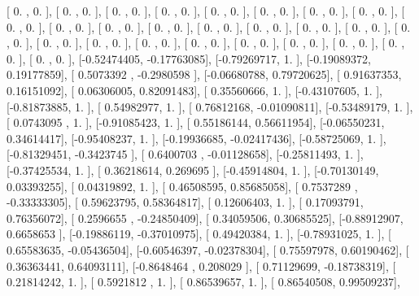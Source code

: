 \documentclass{article}
\begin{document}
       [ 0.        ,  0.        ],
       [ 0.        ,  0.        ],
       [ 0.        ,  0.        ],
       [ 0.        ,  0.        ],
       [ 0.        ,  0.        ],
       [ 0.        ,  0.        ],
       [ 0.        ,  0.        ],
       [ 0.        ,  0.        ],
       [ 0.        ,  0.        ],
       [ 0.        ,  0.        ],
       [ 0.        ,  0.        ],
       [ 0.        ,  0.        ],
       [ 0.        ,  0.        ],
       [ 0.        ,  0.        ],
       [ 0.        ,  0.        ],
       [ 0.        ,  0.        ],
       [ 0.        ,  0.        ],
       [ 0.        ,  0.        ],
       [ 0.        ,  0.        ],
       [ 0.        ,  0.        ],
       [ 0.        ,  0.        ],
       [ 0.        ,  0.        ],
       [ 0.        ,  0.        ],
       [ 0.        ,  0.        ],
       [ 0.        ,  0.        ],
       [ 0.        ,  0.        ],
       [-0.52474405, -0.17763085],
       [-0.79269717,  1.        ],
       [-0.19089372,  0.19177859],
       [ 0.5073392 , -0.2980598 ],
       [-0.06680788,  0.79720625],
       [ 0.91637353,  0.16151092],
       [ 0.06306005,  0.82091483],
       [ 0.35560666,  1.        ],
       [-0.43107605,  1.        ],
       [-0.81873885,  1.        ],
       [ 0.54982977,  1.        ],
       [ 0.76812168, -0.01090811],
       [-0.53489179,  1.        ],
       [ 0.0743095 ,  1.        ],
       [-0.91085423,  1.        ],
       [ 0.55186144,  0.56611954],
       [-0.06550231,  0.34614417],
       [-0.95408237,  1.        ],
       [-0.19936685, -0.02417436],
       [-0.58725069,  1.        ],
       [-0.81329451, -0.3423745 ],
       [ 0.6400703 , -0.01128658],
       [-0.25811493,  1.        ],
       [-0.37425534,  1.        ],
       [ 0.36218614,  0.269695  ],
       [-0.45914804,  1.        ],
       [-0.70130149,  0.03393255],
       [ 0.04319892,  1.        ],
       [ 0.46508595,  0.85685058],
       [ 0.7537289 , -0.33333305],
       [ 0.59623795,  0.58364817],
       [ 0.12606403,  1.        ],
       [ 0.17093791,  0.76356072],
       [ 0.2596655 , -0.24850409],
       [ 0.34059506,  0.30685525],
       [-0.88912907,  0.6658653 ],
       [-0.19886119, -0.37010975],
       [ 0.49420384,  1.        ],
       [-0.78931025,  1.        ],
       [ 0.65583635, -0.05436504],
       [-0.60546397, -0.02378304],
       [ 0.75597978,  0.60190462],
       [ 0.36363441,  0.64093111],
       [-0.8648464 ,  0.208029  ],
       [ 0.71129699, -0.18738319],
       [ 0.21814242,  1.        ],
       [ 0.5921812 ,  1.        ],
       [ 0.86539657,  1.        ],
       [ 0.86540508,  0.99509237],
\end{document}
